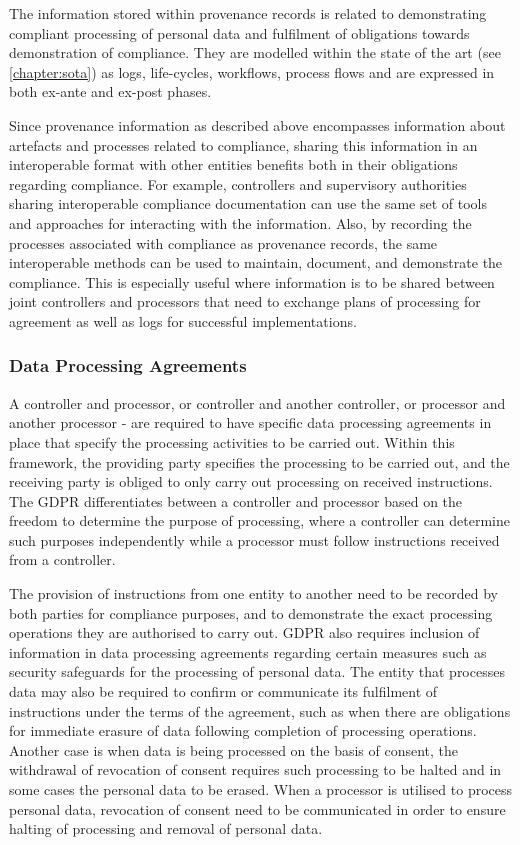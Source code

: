The information stored within provenance records is related to demonstrating compliant processing of personal data and fulfilment of obligations towards demonstration of compliance. They are modelled within the state of the art (see \autoref{chapter:sota}) as logs, life-cycles, workflows, process flows and are expressed in both ex-ante and ex-post phases.

Since provenance information as described above encompasses information about artefacts and processes related to compliance, sharing this information in an interoperable format with other entities benefits both in their obligations regarding compliance. For example, controllers  and supervisory authorities sharing interoperable compliance documentation can use the same set of tools and approaches for interacting with the information. Also, by recording the processes associated with compliance as provenance records, the same interoperable methods can be used to maintain, document, and demonstrate the compliance. This is especially useful where information is to be shared between joint controllers and processors that need to exchange plans of processing for agreement as well as logs for successful implementations.

\subsubsection{Data Processing Agreements}
A controller and processor, or controller and another controller, or processor and another processor - are required to have specific data processing agreements in place that specify the processing activities to be carried out. Within this framework, the providing party specifies the processing to be carried out, and the receiving party is obliged to only carry out processing on received instructions. The GDPR differentiates between a controller and processor based on the freedom to determine the purpose of processing, where a controller can determine such purposes independently while a processor must follow instructions received from a controller.

The provision of instructions from one entity to another need to be recorded by both parties for compliance purposes, and to demonstrate the exact processing operations they are authorised to carry out. GDPR also requires inclusion of information in data processing agreements regarding certain measures such as security safeguards for the processing of personal data. The entity that processes data may also be required to confirm or communicate its fulfilment of instructions under the terms of the agreement, such as when there are obligations for immediate erasure of data following completion of processing operations. Another case is when data is being processed on the basis of consent, the withdrawal of revocation of consent requires such processing to be halted and in some cases the personal data to be erased. When a processor is utilised to process personal data, revocation of consent need to be communicated in order to ensure halting of processing and removal of personal data.

